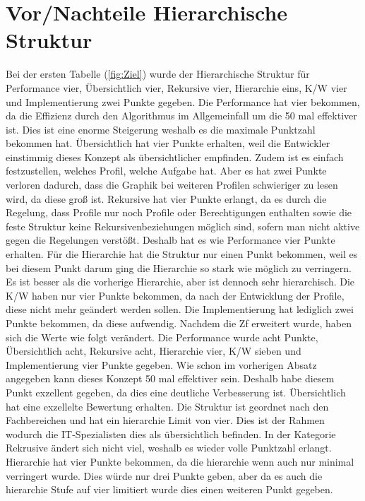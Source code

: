 \section{Vor/Nachteile Hierarchische Struktur}
\label{sec:chapter05:Hierarchische}
Bei der ersten Tabelle (\ref{fig:Ziel}) wurde der Hierarchische Struktur für Performance vier, Übersichtlich vier, Rekursive vier, Hierarchie eins, \ac{K/W} vier und Implementierung zwei Punkte gegeben.
Die Performance hat vier bekommen, da die Effizienz durch den Algorithmus im Allgemeinfall um die 50 mal effektiver ist.
Dies ist eine enorme Steigerung weshalb es die maximale Punktzahl bekommen hat.
Übersichtlich hat vier Punkte erhalten, weil die Entwickler einstimmig dieses Konzept als übersichtlicher empfinden.
Zudem ist es einfach festzustellen, welches Profil, welche Aufgabe hat.
Aber es hat zwei Punkte verloren dadurch, dass die Graphik bei weiteren Profilen schwieriger zu lesen wird, da diese groß ist.
Rekursive hat vier Punkte erlangt, da es durch die Regelung, dass Profile nur noch Profile oder Berechtigungen enthalten sowie die feste Struktur keine Rekursivenbeziehungen möglich sind, sofern man nicht aktive gegen die Regelungen verstößt.
Deshalb hat es wie Performance vier Punkte erhalten.
Für die Hierarchie hat die Struktur nur einen Punkt bekommen, weil es bei diesem Punkt darum ging die Hierarchie so stark wie möglich zu verringern.
Es ist besser als die vorherige Hierarchie, aber ist dennoch sehr hierarchisch.
Die \ac{K/W} haben nur vier Punkte bekommen, da nach der Entwicklung der Profile, diese nicht mehr geändert werden sollen.
Die Implementierung hat lediglich zwei Punkte bekommen, da diese aufwendig.
\newline
\newline
Nachdem die \ac{Zf} erweitert wurde, haben sich die Werte wie folgt verändert.
Die Performance wurde acht Punkte, Übersichtlich acht, Rekursive acht, Hierarchie vier, \ac{K/W} sieben und Implementierung vier Punkte gegeben.
Wie schon im vorherigen Absatz angegeben kann dieses Konzept 50 mal effektiver sein.
Deshalb habe diesem Punkt exzellent gegeben, da dies eine deutliche Verbesserung ist.
Übersichtlich hat eine exzellelte Bewertung erhalten.
Die Struktur ist geordnet nach den Fachbereichen und hat ein hierarchie Limit von vier.
Dies ist der Rahmen wodurch die IT-Spezialisten dies als übersichtlich befinden.
In der Kategorie Rekrusive ändert sich nicht viel, weshalb es wieder volle Punktzahl erlangt.
Hierarchie hat vier Punkte bekommen, da die hierarchie wenn auch nur minimal verringert wurde.
Dies würde nur drei Punkte geben, aber da es auch die hierarchie Stufe auf vier limitiert wurde dies einen weiteren Punkt gegeben.
